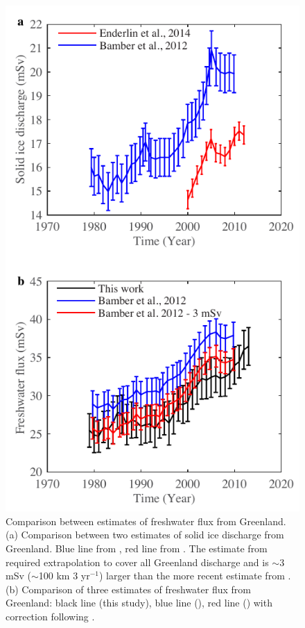 \begin{figure}
	\centering
	\includegraphics{figs_app/FigS4.pdf}
	\caption[Comparison between estimates of freshwater flux from Greenland.]{Comparison between estimates of freshwater flux from Greenland.  (a) Comparison between two estimates of solid ice discharge from Greenland.  Blue line from \citet{bamber2012recent}, red line from \citet{enderlin2014improved}.  The estimate from \citet{bamber2012recent} required extrapolation to cover all Greenland discharge and is $\sim$3 mSv ($\sim$100 km 3 yr$^{-1}$) larger than the more recent estimate from \citet{enderlin2014improved}. (b) Comparison of three estimates of freshwater flux from Greenland: black line (this study), blue line (\citet{bamber2012recent}), red line (\citet{bamber2012recent}) with correction following \citet{enderlin2014improved}.}
	\label{fig:SI4_fig4}
\end{figure}

